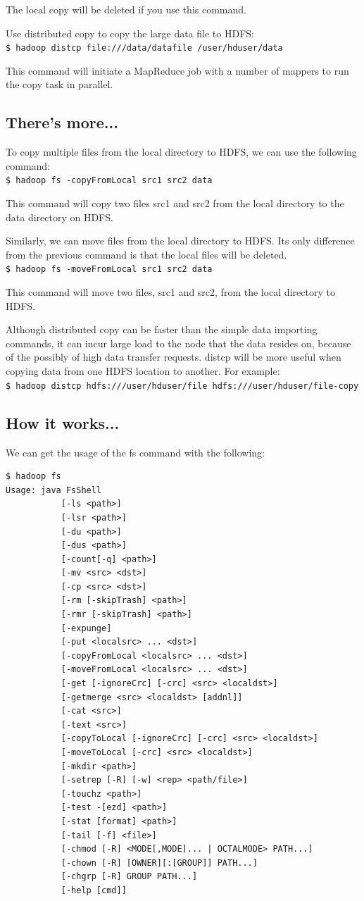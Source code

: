 The local copy will be deleted if you use this command.

Use distributed copy to copy the large data file to HDFS: \\
\verb|$ hadoop distcp file:///data/datafile /user/hduser/data |

This command will initiate a MapReduce job with a number of mappers to run the copy task in parallel.

\subsection*{There's more...}
To copy multiple files from the local directory to HDFS, we can use the following command: \\
\verb|$ hadoop fs -copyFromLocal src1 src2 data|

This command will copy two files src1 and src2 from the local directory to the data directory on HDFS.

Similarly, we can move files from the local directory to HDFS. Its only difference from the previous command is that the local files will be deleted. \\
\verb|$ hadoop fs -moveFromLocal src1 src2 data|

This command will move two files, src1 and src2, from the local directory to HDFS.

Although distributed copy can be faster than the simple data importing commands, it can incur large load to the node that the data resides on, because of the possibly of high data transfer requests. distcp will be more useful when copying data from one HDFS location to another. For example: \\
\verb|$ hadoop distcp hdfs:///user/hduser/file hdfs:///user/hduser/file-copy|

\subsection*{How it works...}
We can get the usage of the fs command with the following:
\begin{verbatim}
$ hadoop fs
Usage: java FsShell
           [-ls <path>]
           [-lsr <path>]
           [-du <path>]
           [-dus <path>]
           [-count[-q] <path>]
           [-mv <src> <dst>]
           [-cp <src> <dst>]
           [-rm [-skipTrash] <path>]
           [-rmr [-skipTrash] <path>]
           [-expunge]
           [-put <localsrc> ... <dst>]
           [-copyFromLocal <localsrc> ... <dst>]
           [-moveFromLocal <localsrc> ... <dst>]
           [-get [-ignoreCrc] [-crc] <src> <localdst>]
           [-getmerge <src> <localdst> [addnl]]
           [-cat <src>]
           [-text <src>]
           [-copyToLocal [-ignoreCrc] [-crc] <src> <localdst>]
           [-moveToLocal [-crc] <src> <localdst>]
           [-mkdir <path>]
           [-setrep [-R] [-w] <rep> <path/file>]
           [-touchz <path>]
           [-test -[ezd] <path>]
           [-stat [format] <path>]
           [-tail [-f] <file>]
           [-chmod [-R] <MODE[,MODE]... | OCTALMODE> PATH...]
           [-chown [-R] [OWNER][:[GROUP]] PATH...]
           [-chgrp [-R] GROUP PATH...]
           [-help [cmd]]
\end{verbatim}

